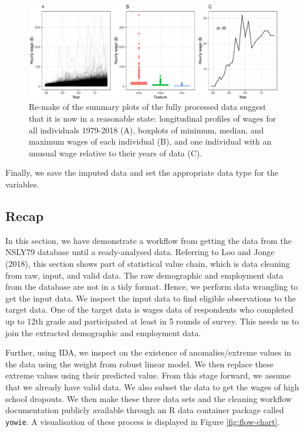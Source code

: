 \documentclass{article}
\begin{document}
\begin{figure}

{\centering \includegraphics[width=1\linewidth]{figures/fixed-feature-plot-1} 

}

\caption{Re-make of the summary plots of the fully processed data suggest that it is now in a reasonable state: longitudinal profiles of wages for all individuals 1979-2018 (A), boxplots of minimum, median, and maximum wages of each individual (B), and one individual with an unusual wage relative to their years of data (C). }\label{fig:fixed-feature-plot}
\end{figure}

Finally, we save the imputed data and set the appropriate data type for the variables.

\hypertarget{recap}{%
\subsection{Recap}\label{recap}}

In this section, we have demonstrate a workflow from getting the data from the NSLY79 database until a ready-analysed data. Referring to Loo and Jonge (2018), this section shows part of statistical value chain, which is data cleaning from raw, input, and valid data. The raw demographic and employment data from the database are not in a tidy format. Hence, we perform data wrangling to get the input data. We inspect the input data to find eligible observations to the target data. One of the target data is wages data of respondents who completed up to 12th grade and participated at least in 5 rounds of survey. This needs us to join the extracted demographic and employment data.

Further, using IDA, we inspect on the existence of anomalies/extreme values in the data using the weight from robust linear model. We then replace these extreme values using their predicted value.
From this stage forward, we assume that we already have valid data. We also subset the data to get the wages of high school dropouts. We then make these three data sets and the cleaning workflow documentation publicly available through an R data container package called \texttt{yowie}. A visualisation of these process is displayed in Figure \ref{fig:flow-chart}.
\end{document}
